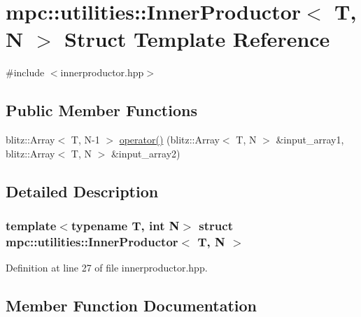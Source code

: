 \hypertarget{structmpc_1_1utilities_1_1_inner_productor}{}\section{mpc\+:\+:utilities\+:\+:Inner\+Productor$<$ T, N $>$ Struct Template Reference}
\label{structmpc_1_1utilities_1_1_inner_productor}


{\ttfamily \#include $<$innerproductor.\+hpp$>$}

\subsection*{Public Member Functions}
\begin{DoxyCompactItemize}
\item 
blitz\+::\+Array$<$ T, N-\/1 $>$ \mbox{\hyperlink{structmpc_1_1utilities_1_1_inner_productor_a161a97fd6bc0f5831b924c3b2e581f85}{operator()}} (blitz\+::\+Array$<$ T, N $>$ \&input\+\_\+array1, blitz\+::\+Array$<$ T, N $>$ \&input\+\_\+array2)
\end{DoxyCompactItemize}


\subsection{Detailed Description}
\subsubsection*{template$<$typename T, int N$>$\newline
struct mpc\+::utilities\+::\+Inner\+Productor$<$ T, N $>$}



Definition at line 27 of file innerproductor.\+hpp.



\subsection{Member Function Documentation}
\mbox{\label{structmpc_1_1utilities_1_1_inner_productor_a161a97fd6bc0f5831b924c3b2e581f85}} 
